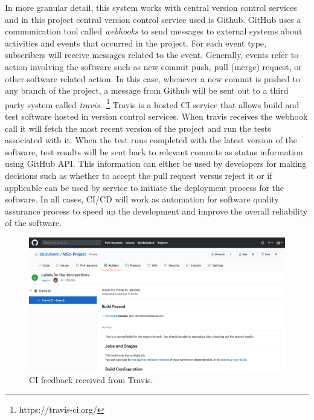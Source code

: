 In more granular detail, this system works with central version control services and in this project central version control service used is Github. GitHub uses a communication tool called \emph{webhooks} to send messages to external systems about activities and events that occurred in the project. For each event type, subscribers will receive messages related to the event. Generally, events refer to action involving the software such as new commit push, pull (merge) request, or other software related action. In this case, whenever a new commit is pushed to any branch of the project, a message from Github will be sent out to a third party system called \emph{travis.}~\footnote{https://travis-ci.org/} Travis is a hosted CI service that allows build and test software hosted in version control services. When travis receives the webhook call it will fetch the most recent version of the project and run the tests associated with it. When the test runs completed with the latest version of the software, test results will be sent back to relevant commits as status information using GitHub API. This information can either be used by developers for making decisions such as whether to accept the pull request versus reject it or if applicable can be used by service to initiate the deployment process for the software. In all cases, CI/CD will work as automation for software quality assurance process to speed up the development and improve the overall reliability of the software.

\begin{figure}[H]
    \centering
    \includegraphics[width=\textwidth]{img/cigithub.png}
    \caption{CI feedback received from Travis.}
    \label{fig:cigithub}
\end{figure}
 


